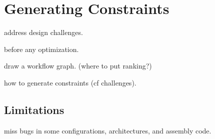 \section{Generating Constraints}
\label{s:gen}

address design challenges.

before any optimization.

draw a workflow graph. (where to put ranking?)

how to generate constraints (cf challenges).

\subsection{Limitations}

miss bugs in some configurations, architectures,
and assembly code.
